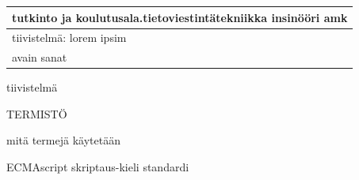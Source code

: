\documentclass[11pt,a4paper,titlepage,oneside]{article}
\begin{document}
\begin{tabular}{ | l | }
    \begin{minipage}[t][1.5cm][t]{10cm}
    tutkinto ja koulutusala.\newline  tietoviestintätekniikka insinööri amk  

    \end{minipage}\\ \hline

    \begin{minipage}[t][7cm][t]{5cm}
    tiivistelmä: \newline lorem ipsim
    \end{minipage}\\ \hline

    \begin{minipage}[t][2cm][t]{5cm}
    avain sanat
    \end{minipage}\\ \hline

\end{tabular}

\newpage




tiivistelmä








\newpage



\setcounter{page}{0}
\pagestyle{empty}

\tableofcontents





\newpage





TERMISTÖ

mitä termejä käytetään


ECMAscript                  skriptaus-kieli standardi 


\newpage





\clearpage
\setcounter{page}{1}
\end{document}

